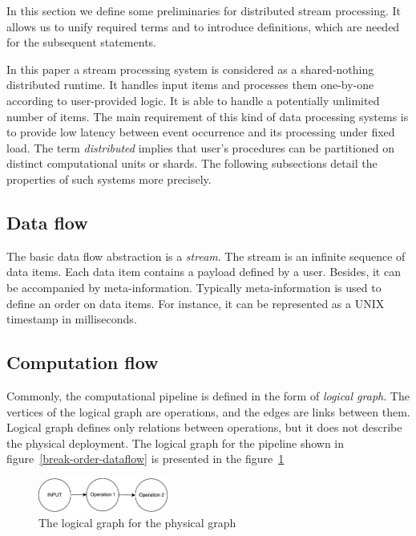 

\label {fs-stream}

In this section we define some preliminaries for distributed stream processing. It allows us to unify required terms and to introduce definitions, which are needed for the subsequent statements.

In this paper a stream processing system is considered as a shared-nothing distributed runtime. It handles input items and processes them one-by-one according to user-provided logic. It is able to handle a potentially unlimited number of items. The main requirement of this kind of data processing systems is to provide low latency between event occurrence and its processing under fixed load. The term {\em distributed} implies that user's procedures can be partitioned on distinct computational units or shards. The following subsections detail the properties of such systems more precisely.  

\subsection{Data flow}
The basic data flow abstraction is a {\it stream}. The stream is an infinite sequence of data items. Each data item contains a payload defined by a user. Besides, it can be accompanied by meta-information. Typically meta-information is used to define an order on data items. For instance, it can be represented as a UNIX timestamp in milliseconds.


\subsection{Computation flow}
Commonly, the computational pipeline is defined in the form of {\it logical graph}. The vertices of the logical graph are operations, and the edges are links between them. Logical graph defines only relations between operations, but it does not describe the physical deployment. The logical graph for the pipeline shown in figure~\ref{break-order-dataflow} is presented in the figure~\ref{break-order-dataflow-logical}

\begin{figure}[htbp]
  \centering
  \includegraphics[width=0.38\textwidth]{pics/break_order_pipeline_logical}
  \caption{The logical graph for the physical graph} 
  \label {break-order-dataflow-logical}
\end{figure}

